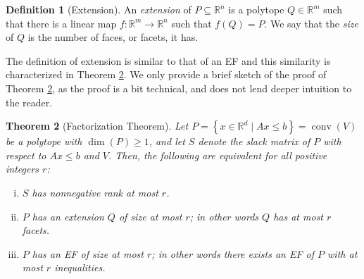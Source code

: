 \documentclass{article}
\newtheorem{theorem}{\sc Theorem}
\theoremstyle{definition}
\newtheorem{definition}[theorem]{Definition}
\theoremstyle{remark}
\newcommand{\conv}{\operatorname{conv}}
\renewcommand{\R}{\mathbb{R}}
\begin{document}
\begin{definition}[Extension]
An \emph{extension} of $P \subseteq \R^n$ is a polytope $Q \in \R^m$ such that there is a linear map $f : \R^m \to \R^n$ such that $f(Q) = P$. We say that the \emph{size} of $Q$ is the number of faces, or facets, it has.
\end{definition}

The definition of extension is similar to that of an EF and this similarity is characterized in Theorem \ref{theor:factor}. We only provide a brief sketch of the proof of Theorem \ref{theor:factor}, as the proof is a bit technical, and does not lend deeper intuition to the reader.

\begin{theorem}[Factorization Theorem]\label{theor:factor}
Let $P = \left\{x \in \R^d \mid Ax \leq b\right\} = \conv(V)$ be a polytope with $\dim(P) \geq 1$, and let $S$ denote the slack matrix of $P$ with respect to $Ax \leq b$ and $V$. Then, the following are equivalent for all positive integers $r$:
\begin{enumerate}[(i)]
\item $S$ has nonnegative rank at most $r$.
\item $P$ has an extension $Q$ of size at most $r$; in other words $Q$ has at most $r$ facets.
\item $P$ has an EF of size at most $r$; in other words there exists an EF of $P$ with at most $r$ inequalities.
\end{enumerate}
\end{theorem}
\end{document}
